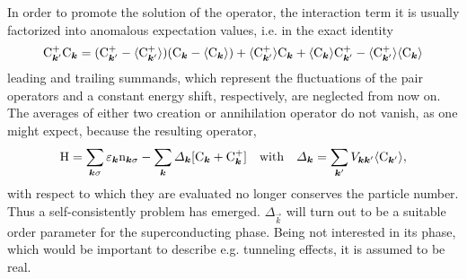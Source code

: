 In order to promote the solution of the  operator, the
interaction term it is usually factorized into anomalous expectation values, i.e.
in the exact identity \cite[Eq.~4.20]{Nolting15}
%
\begin{equation*}
	\mathrm C_{\boldsymbol k'}^+ \mathrm C_{\boldsymbol k} =
    (\mathrm C_{\boldsymbol k'}^+ - \langle\mathrm C_{\boldsymbol k'}^+\rangle)
    (\mathrm C_{\boldsymbol k} - \langle\mathrm C_{\boldsymbol k}\rangle)
    + \langle\mathrm C_{\boldsymbol k'}^+\rangle \mathrm C_{\boldsymbol k}
    + \langle\mathrm C_{\boldsymbol k}\rangle \mathrm C_{\boldsymbol k'}^+
    - \langle\mathrm C_{\boldsymbol k'}^+\rangle \langle\mathrm C_{\boldsymbol k}\rangle
\end{equation*}
%
leading and trailing summands, which represent the fluctuations of the
 pair operators and a constant energy shift, respectively, are
neglected from now on. The averages of either two creation or annihilation
operator do not vanish, as one might expect, because the resulting
 operator,
%
\begin{equation*}
    \mathrm H = \sum_{\boldsymbol k \sigma} \varepsilon_{\boldsymbol k} \mathrm n_{\boldsymbol k \sigma}
    - \sum_{\boldsymbol k} \varDelta_{\boldsymbol k} [\mathrm C_{\boldsymbol k} + \mathrm C_{\boldsymbol k}^+]
    \quad \text{with} \quad
    \varDelta_{\boldsymbol k} = \sum_{\boldsymbol k'} V_{\boldsymbol k \boldsymbol k'} \langle\mathrm C_{\boldsymbol k'}\rangle,
\end{equation*}
%
with respect to which they are evaluated no longer conserves the particle
number. Thus a self-consistently problem has emerged. $\Delta_{\vec k}$ will
turn out to be a suitable order parameter for the superconducting phase. Being
not interested in its phase, which would be important to describe e.g. tunneling
effects, it is assumed to be real.

